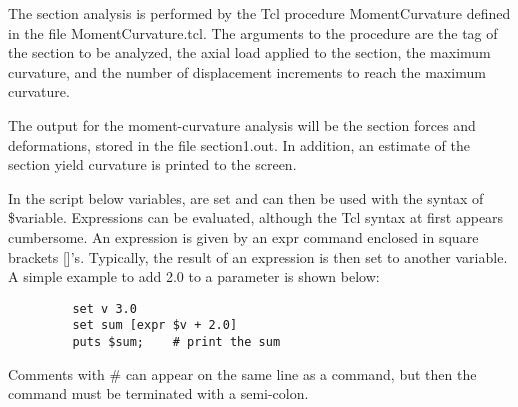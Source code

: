 \documentclass[12pt]{article}
\begin{document}
\pagebreak
\vspace{0.2in}

The section analysis is performed by the Tcl procedure MomentCurvature
defined in the file MomentCurvature.tcl. The arguments to the
procedure are the tag of the section to be analyzed, the axial
load applied to the section, the maximum curvature, and the number
of displacement increments to reach the maximum curvature.

\vspace{0.2in} 

The output for the moment-curvature analysis will be the section
forces and deformations, stored in the file section1.out.
In addition, an estimate of the section yield curvature is
printed to the screen. 

\vspace{0.2in} 

In the script below variables, are set and can then be used with the
syntax of \$variable. Expressions can be evaluated, although the Tcl
syntax at first appears cumbersome.  An expression is given by an expr
command enclosed in square brackets []'s. Typically, the result of an
expression is then set to another variable.  A simple example to add
2.0 to a parameter is shown below:

{\sf\small
\begin{verbatim}
         set v 3.0 
         set sum [expr $v + 2.0] 
         puts $sum;    # print the sum 
\end{verbatim}}

Comments with \# can appear on the same line
as a command, but then the command must be terminated with a
semi-colon.
\end{document}
